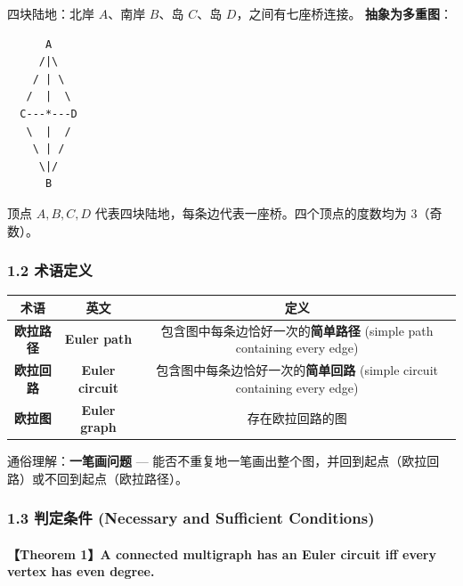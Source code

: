 \documentclass[10pt,a4paper,openany]{ctexbook}
\theoremstyle{definition}
\theoremstyle{remark}
\renewenvironment{quote}
  {\list{}{\leftmargin=1em\rightmargin=0pt\topsep=0.5pt\partopsep=0pt}\item[]}
  {\endlist}
\begin{document}
四块陆地：北岸 $A$、南岸 $B$、岛 $C$、岛 $D$，之间有七座桥连接。
\textbf{抽象为多重图}：
{\footnotesize\begin{verbatim}
      A
     /|\
    / | \
   /  |  \
  C---*---D
   \  |  /
    \ | /
     \|/
      B
\end{verbatim}}

顶点 $A,B,C,D$ 代表四块陆地，每条边代表一座桥。四个顶点的度数均为 3（奇数）。
\vspace{-2pt}

\subsubsection{1.2 术语定义}

\begin{center}
\begin{tabular}{ccc}
\hline
术语 & 英文 & 定义 \\ \hline
\textbf{欧拉路径} & \textbf{Euler path} & 包含图中每条边恰好一次的\textbf{简单路径} (simple path containing every edge) \\
\textbf{欧拉回路} & \textbf{Euler circuit} & 包含图中每条边恰好一次的\textbf{简单回路} (simple circuit containing every edge) \\
\textbf{欧拉图} & \textbf{Euler graph} & 存在欧拉回路的图 \\
\hline
\end{tabular}

\end{center}

\begin{quote}
通俗理解：\textbf{一笔画问题} — 能否不重复地一笔画出整个图，并回到起点（欧拉回路）或不回到起点（欧拉路径）。

\end{quote}
\vspace{-2pt}

\subsubsection{1.3 判定条件 (Necessary and Sufficient Conditions)}

\paragraph{【Theorem 1】A connected multigraph has an \textbf{Euler circuit} iff \textbf{every vertex has even degree}.}
\end{document}
